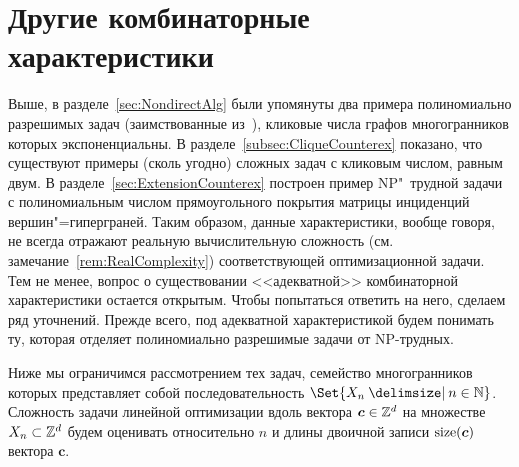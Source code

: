 % 
%

\section{Другие комбинаторные характеристики}
\label{sec:CounterexamplesOther}

Выше, в разделе~\ref{sec:NondirectAlg} были упомянуты два примера полиномиально разрешимых задач (заимствованные из~\cite{BondBook:1995}), кликовые
числа графов многогранников которых экспоненциальны. В разделе~\ref{subsec:CliqueCounterex} показано, что существуют примеры (сколь угодно) сложных задач с кликовым числом, равным двум. В разделе~\ref{sec:ExtensionCounterex} построен пример NP"~трудной задачи с полиномиальным числом прямоугольного покрытия матрицы инциденций вершин"=гиперграней. Таким образом, данные характеристики, вообще говоря, не всегда отражают реальную вычислительную сложность (см. замечание~\ref{rem:RealComplexity}) соответствующей оптимизационной задачи.
Тем не менее, вопрос о существовании <<адекватной>> комбинаторной характеристики остается открытым. 
Чтобы попытаться ответить на него, сделаем ряд уточнений. 
Прежде всего, под адекватной характеристикой будем понимать ту, которая отделяет полиномиально разрешимые задачи от NP-трудных. %

Ниже мы ограничимся рассмотрением тех задач, семейство многогранников которых представляет собой последовательность $\Set{X_n \given n \in \N}$.
Сложность задачи линейной оптимизации вдоль вектора $\bm{c} \in \mathbb{Z}^d$ на множестве $X_n \subset \mathbb{Z}^{d}$ будем оценивать относительно $n$ 
и длины двоичной записи $\operatorname{size}(\bm{c})$ вектора $\bm{c}$.

